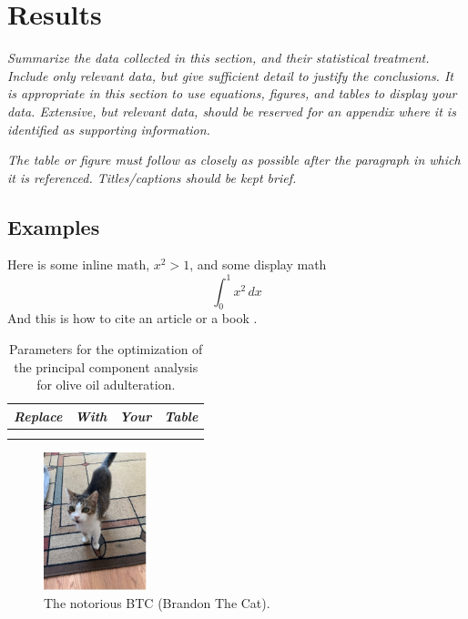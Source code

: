 \documentclass[11pt,a4paper,oneside]{report}
\newcommand{\instructions}[1]{{\color{black}\itshape #1}}
\begin{document}

\chapter{Results}
\label{results}

\instructions{Summarize the data collected in this section, and their
statistical treatment. Include only relevant data, but give sufficient
detail to justify the conclusions. It is appropriate in this section to
use equations, figures, and tables to display your data. Extensive, but
relevant data, should be reserved for an appendix where it is identified
as supporting information.}

\instructions{The table or figure must follow as closely as possible after the
paragraph in which it is referenced. Titles/captions should be kept
brief.}

\section{Examples}

Here is some inline math, $x^2 > 1$, and some display math
\begin{equation}
  \int_0^1 x^2 \, dx
\end{equation}
And this is how to cite an article \cite{Zhang2021} or a book \cite{Axler2020}.

\begin{table}[htbp]
\centering
\begin{tabular}{@{}llll@{}}
\toprule
\emph{Replace} & \emph{With} & \emph{Your} & \emph{Table} \\
\midrule
& & & \\
& & & \\
\bottomrule
\end{tabular}
\caption{Parameters for the optimization of the principal component analysis for
olive oil adulteration.}
\label{tbl:2}  
\end{table}


\begin{figure}[htbp]
\centering
\includegraphics[height=4cm]{btc.jpg}
\caption{The notorious BTC (Brandon The Cat).}
\label{fig:1}
\end{figure}
\end{document}
